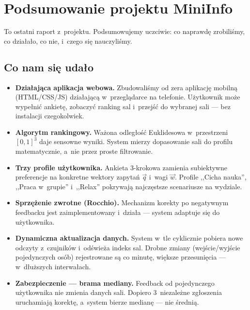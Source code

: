 \documentclass[14pt,a4paper]{extarticle}
\begin{document}
\section{Podsumowanie projektu MiniInfo}

To ostatni raport z~projektu. Podsumowujemy uczciwie: co naprawdę zrobiliśmy, co działało, co nie, i~czego się nauczyliśmy.

\subsection{Co nam się udało}

\begin{itemize}
    \item \textbf{Działająca aplikacja webowa.} Zbudowaliśmy od zera aplikację mobilną (HTML/CSS/JS) działającą w~przeglądarce na telefonie. Użytkownik może wypełnić ankietę, zobaczyć ranking sal i~przejść do wybranej sali --- bez instalacji czegokolwiek.

    \item \textbf{Algorytm rankingowy.} Ważona odległość Euklidesowa w~przestrzeni $[0,1]^3$ daje sensowne wyniki. System mierzy dopasowanie sali do profilu matematycznie, a~nie przez proste filtrowanie.

    \item \textbf{Trzy profile użytkownika.} Ankieta 3-krokowa zamienia subiektywne preferencje na konkretne wektory zapytań $\vec{q}$ i~wagi $\vec{w}$. Profile ,,Cicha nauka'', ,,Praca w~grupie'' i~,,Relax'' pokrywają najczęstsze scenariusze na wydziale.

    \item \textbf{Sprzężenie zwrotne (Rocchio).} Mechanizm korekty po negatywnym feedbacku jest zaimplementowany i~działa --- system adaptuje się do użytkownika.

    \item \textbf{Dynamiczna aktualizacja danych.} System w~tle cyklicznie pobiera nowe odczyty z~czujników i~odświeża indeks sal. Drobne zmiany (wejście/wyjście pojedynczych osób) rejestrowane są co minutę, większe przesunięcia --- w~dłuższych interwałach.

    \item \textbf{Zabezpieczenie --- brama mediany.} Feedback od pojedynczego użytkownika nie zmienia danych sali. Dopiero 3~niezależne zgłoszenia uruchamiają korektę, a~system bierze medianę --- nie średnią.


\end{itemize}
\end{document}
